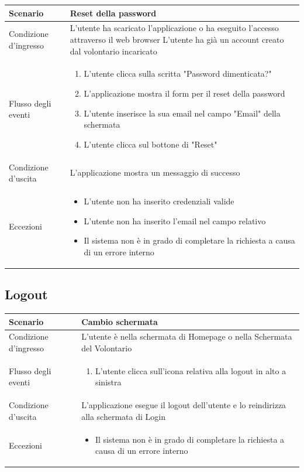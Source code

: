 \documentclass[12pt,a4paper,twoside,openright,titlepage]{book}
\begin{document}
\begin{table}[H]
\centering
\begin{tabular}{|p{4cm}|p{10cm}|}
\hline
Scenario & Reset della password \\
\hline
Condizione d'ingresso & L'utente ha scaricato l'applicazione o ha eseguito l'accesso attraverso il web browser \newline
L'utente ha già un account creato dal volontario incaricato \\
\hline
Flusso degli eventi & 
\begin{enumerate}
\item L'utente clicca sulla scritta "Password dimenticata?"
\item L'applicazione mostra il form per il reset della password
\item L'utente inserisce la sua email nel campo "Email" della schermata
\item L'utente clicca sul bottone di "Reset"
\end{enumerate}\\
\hline
Condizione d'uscita & L'applicazione mostra un messaggio di successo\\
\hline
Eccezioni & 
\begin{itemize}
\item L'utente non ha inserito credenziali valide
\item L'utente non ha inserito l'email nel campo relativo
\item Il sistema non è in grado di completare la richiesta a causa di un errore interno
\end{itemize} \\
\hline
\end{tabular}
\end{table}

\subsection{Logout}
\begin{table}[H]
\centering
\begin{tabular}{|p{4cm}|p{10cm}|}
\hline
Scenario & Cambio schermata \\
\hline
Condizione d'ingresso & L'utente è nella schermata di Homepage o nella Schermata del Volontario\\
\hline
Flusso degli eventi & 
\begin{enumerate}
\item L'utente clicca sull'icona relativa alla logout in alto a sinistra
\end{enumerate}\\
\hline
Condizione d'uscita & L'applicazione esegue il logout dell'utente e lo reindirizza alla schermata di Login
\\
\hline
Eccezioni & 
\begin{itemize}
\item Il sistema non è in grado di completare la richiesta a causa di un errore interno
\end{itemize} \\
\hline
\end{tabular}
\end{table}
\end{document}
